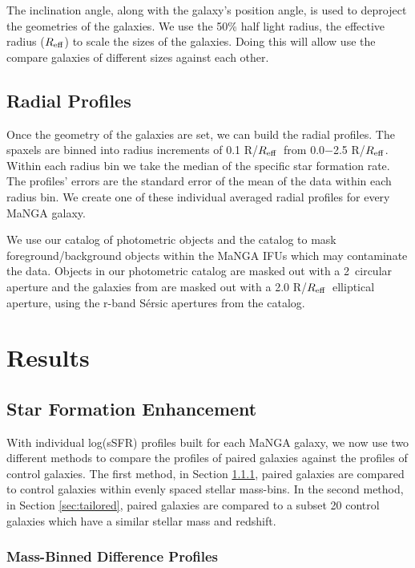 \documentclass[iop,revtex4,twocolumn,apj,numberedappendix,appendixfloats]{emulateapj}
\newcommand{\reff}{$R_{\rm eff}$}
\begin{document}
The inclination angle, along with the galaxy's position angle, is used to deproject the geometries of the galaxies. We use the 50\% half light radius, the effective radius (\reff) to scale the sizes of the galaxies. Doing this will allow use the compare galaxies of different sizes against each other.

\subsection{Radial Profiles}

Once the geometry of the galaxies are set, we can build the radial profiles. The spaxels are binned into radius increments of 0.1 R/\reff\ from 0.0$-$2.5 R/\reff. Within each radius bin we take the median of the specific star formation rate. The profiles' errors are the standard error of the mean of the data within each radius bin. We create one of these individual averaged radial profiles for every MaNGA galaxy. 

We use our catalog of photometric objects and the \citet{Simard:2011} catalog to mask foreground/background objects within the MaNGA IFUs which may contaminate the data. Objects in our photometric catalog are masked out with a 2\arcsec\ circular aperture and the galaxies from \citet{Simard:2011} are masked out with a 2.0 R/\reff\ elliptical aperture, using the r-band S\'ersic apertures from the catalog. 


\section{Results}\label{sec:results}

\subsection{Star Formation Enhancement}

With individual log(sSFR) profiles built for each MaNGA galaxy, we now use two different methods to compare the profiles of paired galaxies against the profiles of control galaxies. The first method, in Section \ref{sec:mass-bin}, paired galaxies are compared to control galaxies within evenly spaced stellar mass-bins. In the second method, in Section \ref{sec:tailored}, paired galaxies are compared to a subset 20 control galaxies which have a similar stellar mass and redshift. 

\subsubsection{Mass-Binned Difference Profiles}\label{sec:mass-bin}
\end{document}
